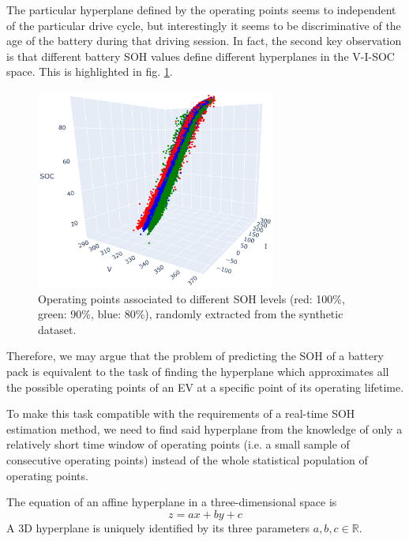 The particular hyperplane defined by the operating points seems to independent of the particular drive cycle, but interestingly it seems to be discriminative of the age of the battery during that driving session. In fact, the second key observation is that different battery SOH values define different hyperplanes in the V-I-SOC space. This is highlighted in fig. \ref{fig:visoc_soh_planes}.

\begin{figure}
    \centering
    \hspace{-1cm}
    \includegraphics[width=0.7\textwidth]{images/visoc_soh_planes}
    \caption[Synthetic Operating points associated to different SOH levels]{Operating points associated to different SOH levels (red: 100\%, green: 90\%, blue: 80\%), randomly extracted from the synthetic dataset.}
    \label{fig:visoc_soh_planes}
\end{figure}

Therefore, we may argue that the problem of predicting the SOH of a battery pack is equivalent to the task of finding the hyperplane which approximates all the possible operating points of an EV at a specific point of its operating lifetime.

To make this task compatible with the requirements of a real-time SOH estimation method, we need to find said hyperplane from the knowledge of only a relatively short time window of operating points (i.e. a small sample of consecutive operating points) instead of the whole statistical population of operating points.

The equation of an affine hyperplane in a three-dimensional space is
\begin{equation}
    z=ax+by+c
\end{equation}
A 3D hyperplane is uniquely identified by its three parameters $a, b, c \in \mathbb{R}$.

